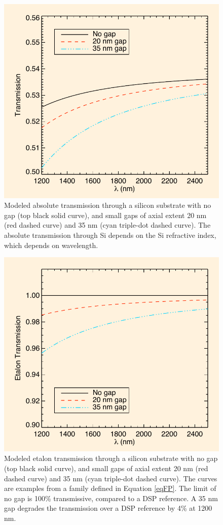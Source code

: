 \documentclass[osajnl,preprint,showpacs,superscriptaddress,12pt]{revtex4-1} %
\begin{document}
\begin{figure}[htbp]
\centerline{\includegraphics[width=0.65\columnwidth]{figs/20140421_absolute.pdf}}
\caption{Modeled absolute transmission through a silicon substrate with no gap (top black solid curve), and small gaps of axial extent 20 nm (red dashed curve) and 35 nm (cyan triple-dot dashed curve)\label{figAbsoluteTrans}.  The absolute transmission through Si depends on the Si refractive index, which depends on wavelength. }
\end{figure}

\begin{figure}[htbp]
\centerline{\includegraphics[width=0.65\columnwidth]{figs/20140421_absoluteB.pdf}}
\caption{Modeled etalon transmission through a silicon substrate with no gap (top black solid curve), and small gaps of axial extent 20 nm (red dashed curve) and 35 nm (cyan triple-dot dashed curve)\label{figEtalonRelTrans}.  The curves are examples from a family defined in Equation \ref{eqFP}.   The limit of no gap is 100\% transmissive, compared to a DSP reference.  A 35 nm gap degrades the transmission over a DSP reference by 4\% at 1200 nm.}
\end{figure}
\end{document}
